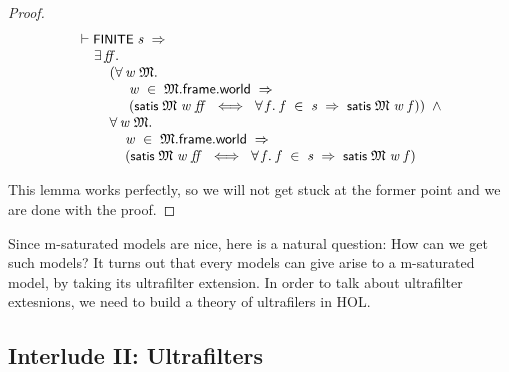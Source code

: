 \documentclass[letterpaper]{article}
\renewcommand{\HOLConst}[1]{{\textsf{\upshape\small #1}}}
\newenvironment{holmath}{\begin{displaymath}\begin{array}{l}}{\end{array}\end{displaymath}\ignorespacesafterend}
\begin{document}
\begin{proof}
\begin{holmath}
  \ensuremath{\HOLTokenTurnstile}\HOLConst{FINITE}\;\HOLFreeVar{s}\;\HOLSymConst{\HOLTokenImp{}}\\
\;\;\;\;\;\HOLSymConst{\HOLTokenExists{}}\HOLBoundVar{ff}.\\
\;\;\;\;\;\;\;\;\;(\HOLSymConst{\HOLTokenForall{}}\HOLBoundVar{w}\;\HOLBoundVar{\ensuremath{\mathfrak{M}}}.\\
\;\;\;\;\;\;\;\;\;\;\;\;\;\;\HOLBoundVar{w}\;\HOLSymConst{\HOLTokenIn{}}\;\HOLBoundVar{\ensuremath{\mathfrak{M}}}.\HOLFieldName{frame}.\HOLFieldName{world}\;\HOLSymConst{\HOLTokenImp{}}\\
\;\;\;\;\;\;\;\;\;\;\;\;\;\;(\HOLConst{satis}\;\HOLBoundVar{\ensuremath{\mathfrak{M}}}\;\HOLBoundVar{w}\;\HOLBoundVar{ff}\;\HOLSymConst{\HOLTokenEquiv{}}\;\HOLSymConst{\HOLTokenForall{}}\HOLBoundVar{f}.\;\HOLBoundVar{f}\;\HOLSymConst{\HOLTokenIn{}}\;\HOLFreeVar{s}\;\HOLSymConst{\HOLTokenImp{}}\;\HOLConst{satis}\;\HOLBoundVar{\ensuremath{\mathfrak{M}}}\;\HOLBoundVar{w}\;\HOLBoundVar{f}))\;\HOLSymConst{\HOLTokenConj{}}\\
\;\;\;\;\;\;\;\;\;\HOLSymConst{\HOLTokenForall{}}\HOLBoundVar{w}\;\HOLBoundVar{\ensuremath{\mathfrak{M}}}.\\
\;\;\;\;\;\;\;\;\;\;\;\;\;\HOLBoundVar{w}\;\HOLSymConst{\HOLTokenIn{}}\;\HOLBoundVar{\ensuremath{\mathfrak{M}}}.\HOLFieldName{frame}.\HOLFieldName{world}\;\HOLSymConst{\HOLTokenImp{}}\\
\;\;\;\;\;\;\;\;\;\;\;\;\;(\HOLConst{satis}\;\HOLBoundVar{\ensuremath{\mathfrak{M}}}\;\HOLBoundVar{w}\;\HOLBoundVar{ff}\;\HOLSymConst{\HOLTokenEquiv{}}\;\HOLSymConst{\HOLTokenForall{}}\HOLBoundVar{f}.\;\HOLBoundVar{f}\;\HOLSymConst{\HOLTokenIn{}}\;\HOLFreeVar{s}\;\HOLSymConst{\HOLTokenImp{}}\;\HOLConst{satis}\;\HOLBoundVar{\ensuremath{\mathfrak{M}}}\;\HOLBoundVar{w}\;\HOLBoundVar{f})
\end{holmath}

This lemma works perfectly, so we will not get stuck at the former point and we are done with the proof.
\end{proof}

Since m-saturated models are nice, here is a natural question: How can we get such models? It turns out that every models can give arise to a m-saturated model, by taking its ultrafilter extension. In order to talk about ultrafilter extesnions, we need to build a theory of ultrafilers in HOL.

\subsection{Interlude II: Ultrafilters}
\end{document}
